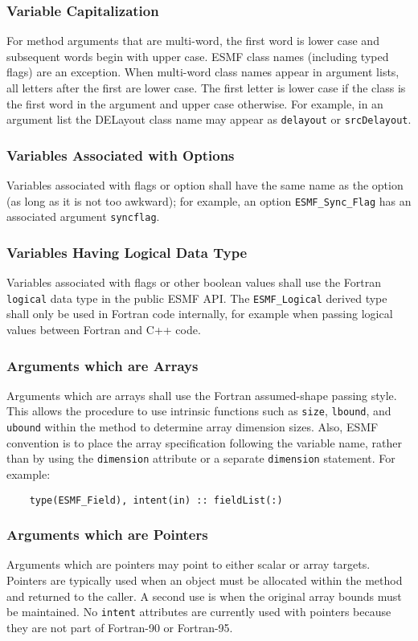 \subsubsection{Variable Capitalization} 
For method arguments that are multi-word, the first word is lower
case and subsequent words begin with upper case.  ESMF class 
names (including typed flags) are an exception.  When multi-word 
class names appear in argument lists, all letters after the first 
are lower case.  The first letter is lower case if the class is the
first word in the argument and upper case otherwise.  For 
example, in an argument list the DELayout class name may appear 
as {\tt delayout} or {\tt srcDelayout}.

\subsubsection{Variables Associated with Options}
Variables associated with flags or option shall have the same name as
the option (as long as it is not too awkward); for example, an option 
{\tt ESMF\_Sync\_Flag} has an associated argument {\tt syncflag}.

\subsubsection{Variables Having Logical Data Type}
Variables associated with flags or other boolean values shall use
the Fortran {\tt logical} data type in the public ESMF API.  The {\tt ESMF\_Logical}
derived type shall only be used in Fortran code internally, for example when passing
logical values between Fortran and C++ code.

\subsubsection{Arguments which are Arrays}
Arguments which are arrays shall use the Fortran assumed-shape passing style.
This allows the procedure to use intrinsic functions such as {\tt size},
{\tt lbound}, and {\tt ubound} within the method to determine array
dimension sizes.  Also, ESMF convention is to place the array specification
following the variable name, rather than by using the {\tt dimension}
attribute or a separate {\tt dimension} statement.  For example:
\begin{verbatim}
    type(ESMF_Field), intent(in) :: fieldList(:)
\end{verbatim}

\subsubsection{Arguments which are Pointers}
Arguments which are pointers may point to either scalar or array targets.
Pointers are typically used when an object must be allocated within the method
and returned to the caller.  A second use is when the original array bounds
must be maintained.  No {\tt intent} attributes are currently used with
pointers because they are not part of Fortran-90 or Fortran-95.

